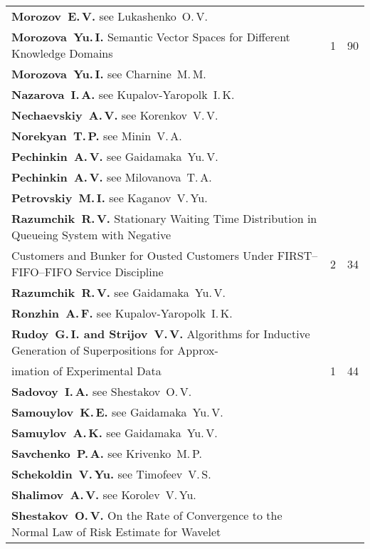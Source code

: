 {\begin{tabular}{p{397pt}rr}
\textbf{Morozov~E.\,V.} see Lukashenko~O.\,V.&&\\
\textbf{Morozova~Yu.\,I.}
Semantic Vector Spaces for Different Knowledge Domains\dotfill&1&90\\
\textbf{Morozova~Yu.\,I.} see Charnine~M.\,M.&&\\
\textbf{Nazarova~I.\,A.} see Kupalov-Yaropolk~I.\,K.&&\\
\textbf{Nechaevskiy~A.\,V.} see Korenkov~V.\,V.&&\\
\textbf{Norekyan~T.\,P.} see Minin~V.\,A.&&\\
\textbf{Pechinkin~A.\,V.} see Gaidamaka~Yu.\,V.&&\\
\textbf{Pechinkin~A.\,V.} see Milovanova~T.\,A.&&\\
\textbf{Petrovskiy~M.\,I.} see Kaganov~V.\,Yu.&&\\
\textbf{Razumchik~R.\,V.}
Stationary Waiting Time Distribution in Queueing System with Negative\linebreak
\vspace*{-12pt}\\
\hspace*{23pt}Customers and Bunker for Ousted Customers
Under FIRST--FIFO--FIFO Service Discipline&2&34\\
\textbf{Razumchik~R.\,V.} see Gaidamaka~Yu.\,V.&&\\
\textbf{Ronzhin~A.\,F.} see Kupalov-Yaropolk~I.\,K.&&\\
\textbf{Rudoy~G.\,I. and Strijov~V.\,V.}
Algorithms for Inductive Generation of Superpositions for Approx-\linebreak
\vspace*{-12pt}\\
\hspace*{23pt}imation of Experimental Data\dotfill&1&44\\
\textbf{Sadovoy~I.\,A.} see Shestakov~O.\,V.&&\\
\textbf{Samouylov~K.\,E.} see Gaidamaka~Yu.\,V.&&\\
\textbf{Samuylov~A.\,K.} see Gaidamaka~Yu.\,V.&&\\
\textbf{Savchenko~P.\,A.} see Krivenko~M.\,P.&&\\
\textbf{Schekoldin~V.\,Yu.} see Timofeev~V.\,S.&&\\
\textbf{Shalimov~A.\,V.} see Korolev~V.\,Yu.&&\\
\textbf{Shestakov~O.\,V.}
On the Rate of Convergence to the Normal Law of Risk Estimate for Wavelet\linebreak
\vspace*{-12pt}\\

\end{tabular}}
